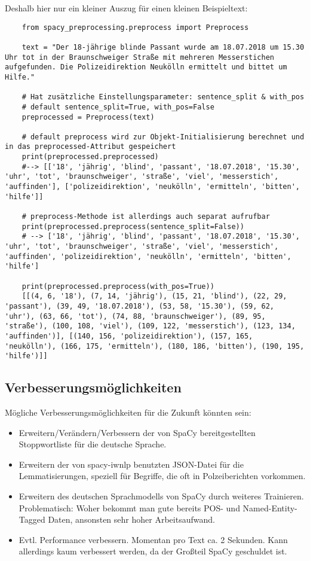 Deshalb hier nur ein kleiner Auszug für einen kleinen Beispieltext:
\begin{verbatim}
    from spacy_preprocessing.preprocess import Preprocess
    
    text = "Der 18-jährige blinde Passant wurde am 18.07.2018 um 15.30 Uhr tot in der Braunschweiger Straße mit mehreren Messerstichen aufgefunden. Die Polizeidirektion Neukölln ermittelt und bittet um Hilfe."
    
    # Hat zusätzliche Einstellungsparameter: sentence_split & with_pos
    # default sentence_split=True, with_pos=False
    preprocessed = Preprocess(text)
    
    # default preprocess wird zur Objekt-Initialisierung berechnet und in das preprocessed-Attribut gespeichert
    print(preprocessed.preprocessed)
    #--> [['18', 'jährig', 'blind', 'passant', '18.07.2018', '15.30', 'uhr', 'tot', 'braunschweiger', 'straße', 'viel', 'messerstich', 'auffinden'], ['polizeidirektion', 'neukölln', 'ermitteln', 'bitten', 'hilfe']]
    
    # preprocess-Methode ist allerdings auch separat aufrufbar
    print(preprocessed.preprocess(sentence_split=False))
    # --> ['18', 'jährig', 'blind', 'passant', '18.07.2018', '15.30', 'uhr', 'tot', 'braunschweiger', 'straße', 'viel', 'messerstich', 'auffinden', 'polizeidirektion', 'neukölln', 'ermitteln', 'bitten', 'hilfe']
    
    print(preprocessed.preprocess(with_pos=True))
    [[(4, 6, '18'), (7, 14, 'jährig'), (15, 21, 'blind'), (22, 29, 'passant'), (39, 49, '18.07.2018'), (53, 58, '15.30'), (59, 62, 'uhr'), (63, 66, 'tot'), (74, 88, 'braunschweiger'), (89, 95, 'straße'), (100, 108, 'viel'), (109, 122, 'messerstich'), (123, 134, 'auffinden')], [(140, 156, 'polizeidirektion'), (157, 165, 'neukölln'), (166, 175, 'ermitteln'), (180, 186, 'bitten'), (190, 195, 'hilfe')]]
    \end{verbatim}

\subsection{Verbesserungsmöglichkeiten}
Mögliche Verbesserungsmöglichkeiten für die Zukunft könnten sein:
\begin{itemize}
\item Erweitern/Verändern/Verbessern der von SpaCy bereitgestellten Stoppwortliste für die deutsche Sprache.
\item Erweitern der von spacy-iwnlp benutzten JSON-Datei für die Lemmatisierungen, speziell für Begriffe, die oft in Polzeiberichten vorkommen.
\item Erweitern des deutschen Sprachmodells von SpaCy durch weiteres Trainieren. Problematisch: Woher bekommt man gute bereits POS- und Named-Entity-Tagged Daten, ansonsten sehr hoher Arbeitsaufwand.
\item Evtl. Performance verbessern. Momentan pro Text ca. 2 Sekunden. Kann allerdings kaum verbessert werden, da der Großteil SpaCy geschuldet ist.
\end{itemize}
